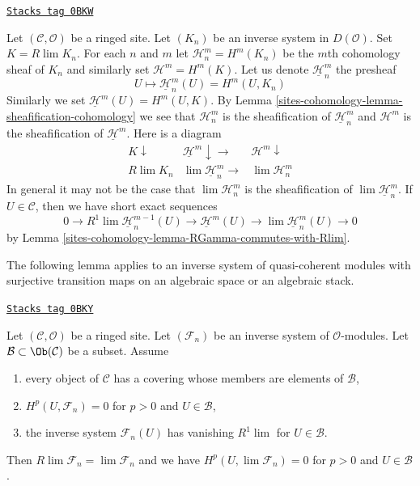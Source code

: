 \begin{remark}
\label{sites-cohomology-remark-discuss-derived-limit}
\href{https://stacks.math.columbia.edu/tag/0BKW}{\texttt{Stacks tag 0BKW}}

Let $(\mathcal{C}, \mathcal{O})$ be a ringed site. Let $(K_n)$ be an inverse
system in $D(\mathcal{O})$. Set $K = R\lim K_n$. For each $n$ and $m$
let $\mathcal{H}^m_n = H^m(K_n)$ be the $m$th cohomology sheaf of
$K_n$ and similarly set $\mathcal{H}^m = H^m(K)$. Let us denote
$\underline{\mathcal{H}}^m_n$ the presheaf
$$
U \longmapsto \underline{\mathcal{H}}^m_n(U) = H^m(U, K_n)
$$
Similarly we set $\underline{\mathcal{H}}^m(U) = H^m(U, K)$.
By Lemma \ref{sites-cohomology-lemma-sheafification-cohomology} we see that
$\mathcal{H}^m_n$ is the sheafification of
$\underline{\mathcal{H}}^m_n$ and $\mathcal{H}^m$ is the
sheafification of $\underline{\mathcal{H}}^m$.
Here is a diagram
$$
\begin{array}{ccc}K \downarrow & \underline{\mathcal{H}}^m \downarrow\longrightarrow & \mathcal{H}^m \downarrow \\ R\lim K_n & \lim \underline{\mathcal{H}}^m_n \longrightarrow & \lim \mathcal{H}^m_n\end{array}
$$
In general it may not be the case that
$\lim \mathcal{H}^m_n$ is the sheafification of
$\lim \underline{\mathcal{H}}^m_n$.
If $U \in \mathcal{C}$, then we have short exact
sequences
\begin{equation}
\label{equation-ses-Rlim-over-U}
0 \to
R^1\lim \underline{\mathcal{H}}^{m - 1}_n(U) \to
\underline{\mathcal{H}}^m(U) \to
\lim \underline{\mathcal{H}}^m_n(U) \to 0
\end{equation}
by Lemma \ref{sites-cohomology-lemma-RGamma-commutes-with-Rlim}.
\end{remark}

The following lemma applies to an inverse system of quasi-coherent
modules with surjective transition maps on an algebraic space or
an algebraic stack.

\begin{lemma}
\label{sites-cohomology-lemma-inverse-limit-is-derived-limit}
\href{https://stacks.math.columbia.edu/tag/0BKY}{\texttt{Stacks tag 0BKY}}

Let $(\mathcal{C}, \mathcal{O})$ be a ringed site. Let $(\mathcal{F}_n)$ be an
inverse system of $\mathcal{O}$-modules. Let
$\mathcal{B} \subset \Ob(\mathcal{C})$ be a subset. Assume
\begin{enumerate}
\item every object of $\mathcal{C}$ has a covering whose members are elements
of $\mathcal{B}$,
\item $H^p(U, \mathcal{F}_n) = 0$ for $p > 0$ and $U \in \mathcal{B}$,
\item the inverse system $\mathcal{F}_n(U)$ has vanishing $R^1\lim$
for $U \in \mathcal{B}$.
\end{enumerate}
Then $R\lim \mathcal{F}_n = \lim \mathcal{F}_n$ and we have
$H^p(U, \lim \mathcal{F}_n) = 0$ for $p > 0$ and $U \in \mathcal{B}$.
\end{lemma}


